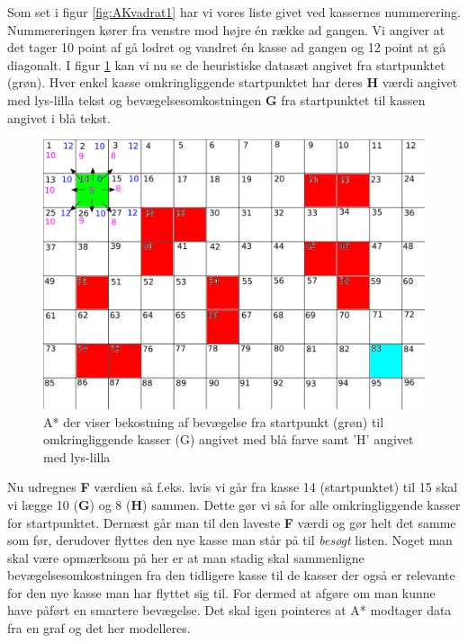 Som set i figur \ref{fig:AKvadrat1} har vi vores liste givet ved kassernes nummerering. Nummereringen kører fra venstre mod højre én række ad gangen. Vi angiver at det tager 10 point af gå lodret og vandret én kasse ad gangen og 12 point at gå diagonalt. I figur \ref{fig:AKvadrat2} kan vi nu se de heuristiske datasæt angivet fra startpunktet (grøn). Hver enkel kasse omkringliggende startpunktet har deres \textbf{H} værdi angivet med lys-lilla tekst og bevægelsesomkostningen \textbf{G} fra startpunktet til kassen angivet i blå tekst.

\begin{figure}[ht!]
\begin{center}
\includegraphics[width=1.00\textwidth]{Pictures/Teoriafsnit/Figurfiler/Grid3.png}
\end{center}
\label{fig:AKvadrat2}
\caption{A* der viser bekostning af bevægelse fra startpunkt (grøn) til omkringliggende kasser (G) angivet med blå farve samt 'H' angivet med lys-lilla}
\end{figure}

Nu udregnes \textbf{F} værdien så f.eks. hvis vi går fra kasse 14 (startpunktet) til 15 skal vi lægge 10 (\textbf{G}) og 8 (\textbf{H}) sammen. Dette gør vi så for alle omkringliggende kasser for startpunktet. Dernæst går man til den laveste \textbf{F} værdi og gør helt det samme som før, derudover flyttes den nye kasse man står på til \textit{besøgt} listen. Noget man skal være opmærksom på her er at man stadig skal sammenligne bevægelsesomkostningen fra den tidligere kasse til de kasser der også er relevante for den nye kasse man har flyttet sig til. For dermed at afgøre om man kunne have påført en smartere bevægelse. Det skal igen pointeres at A* modtager data fra en graf og det her modelleres.

